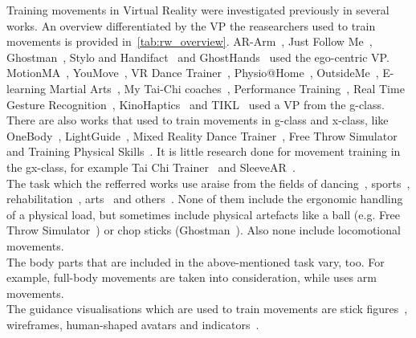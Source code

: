 Training movements in Virtual Reality were investigated previously in several works. An overview differentiated by the VP the reasearchers used to train movements is provided in~\ref{tab:rw_overview}. AR-Arm~\cite{ararm}, Just Follow Me~\cite{justfollowme}, Ghostman~\cite{ghostman}, Stylo and Handifact~\cite{stylo} and GhostHands~\cite{ghosthands} used the ego-centric VP. MotionMA~\cite{motionma}, YouMove~\cite{YouMove}, VR Dance Trainer~\cite{vrdancetrainer}, Physio@Home~\cite{physioathome}, OutsideMe~\cite{outsideme}, E-learning Martial Arts~\cite{elearningma}, My Tai-Chi coaches~\cite{mythaichicoaches}, Performance Training~\cite{performancetraining}, Real Time Gesture Recognition~\cite{rtgesturerecognistion}, KinoHaptics~\cite{kinohaptics} and TIKL~\cite{tikl} used a VP from the g-class. There are also works that used to train movements in g-class and x-class, like OneBody~\cite{onebody}, LightGuide~\cite{lightguide}, Mixed Reality Dance Trainer~\cite{mrdancetrainer}, Free Throw Simulator~\cite{freethrowsimulator} and Training Physical Skills~\cite{trainingphysicalskills}. It is little research done for movement training in the gx-class, for example Tai Chi Trainer~\cite{thaichichua} and SleeveAR~\cite{sleevear}.\\
The task which the refferred works use araise from the fields of dancing~\cite{YouMove,vrdancetrainer,outsideme,performancetraining,mrdancetrainer}, sports~\cite{freethrowsimulator,trainingphysicalskills}, rehabilitation~\cite{motionma,physioathome,kinohaptics,sleevear,veimprovesml}, arts~\cite{ararm,justfollowme,stylo,elearningma,mythaichicoaches,rtgesturerecognistion,onebody,thaichichua} and others~\cite{tikl,lightguide}. None of them include the ergonomic handling of a physical load, but sometimes include physical artefacts like a ball (e.g. Free Throw Simulator~\cite{}) or chop sticks (Ghostman~\cite{ghostman}). Also none include locomotional movements.\\
The body parts that are included in the above-mentioned task vary, too. For example, \cite{YouMove, thaichichua,onebody,vrdancetrainer} full-body movements are taken into consideration, while \cite{ararm,sleevear,ghosthands} uses arm movements.\\
The guidance visualisations which are used to train movements are stick figures~\cite{onebody,YouMove,vrdancetrainer,performancetraining}, wireframes\cite{thaichichua,mrdancetrainer}, human-shaped avatars\cite{thaichichua,vrdancetrainer,trainingphysicalskills,mythaichicoaches} and indicators~\cite{ararm,physioathome,sleevear,ghostman}.\\

